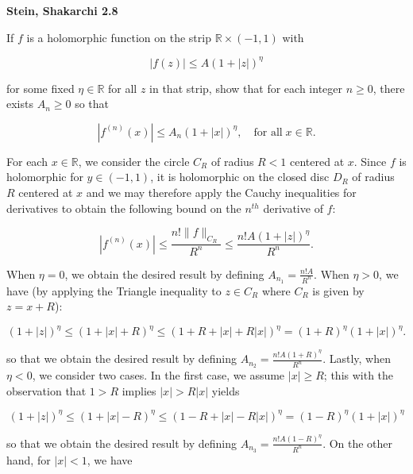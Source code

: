 \textbf{Stein, Shakarchi 2.8}

If $f$ is a holomorphic function on the strip $\mathbb{R} \times (-1, 1)$ with

$$
\left| f(z)  \right| \le A (1 + |z|)^{\eta}
$$

for some fixed $\eta \in \mathbb{R}$ for all $z$ in that strip, show that for each integer $n \ge 0$, there exists 
$A_n \ge 0$ so that 

$$
\left| f^{(n)}(x) \right| \le A_n (1 + |x|)^{\eta}, \quad \text{for all} \; x \in \mathbb{R}.
$$

\begin{solution}
    For each $x \in \mathbb{R}$, we consider the circle $C_R$ of radius $R < 1$ centered at $x$. Since $f$ is 
    holomorphic for $y \in (-1, 1)$, it is holomorphic on the closed disc $D_R$ of radius $R$ centered at $x$ and we
    may therefore apply the Cauchy inequalities for derivatives to obtain the following bound on the $n^{th}$ derivative 
    of $f$:

    $$
    \left| f^{(n)}(x) \right| \le \frac{n! \lVert f \rVert_{C_R}}{R^n} 
                              \le \frac{n! A(1 + |z|)^{\eta}}{R^n}.
    $$

    When $\eta = 0$, we obtain the desired result by defining $A_{n_1} = \frac{n! A}{R^n}$. When $\eta > 0$, we have (by 
    applying the Triangle inequality to $z \in C_R$ where $C_R$ is given by $z = x + R$):

    $$
    \left(1 + |z| \right)^{\eta} \le \left(1 + |x| + R \right)^{\eta} 
                                 \le (1 + R + |x| + R|x|)^{\eta} 
                                 = (1 + R)^{\eta} (1 + |x|)^{\eta}.
    $$

    so that we obtain the desired result by defining $A_{n_2} = \frac{n! A (1 + R)^{\eta}}{R^n}$. Lastly, when $\eta < 0$, 
    we consider two cases. In the first case, we assume $|x| \ge R$; this with the observation that $1 > R$ implies
    $|x| > R |x|$ yields

    $$
    \left(1 + |z| \right)^{\eta} \le \left(1 + |x| - R \right)^{\eta} 
                                 \le (1 - R + |x| - R|x|)^{\eta} 
                                 = (1 - R)^{\eta} (1 + |x|)^{\eta}
    $$

    so that we obtain the desired result by defining $A_{n_3} = \frac{n! A (1 - R)^{\eta}}{R^n}$. On the other hand, for 
    $|x| < 1$, we have


\end{solution}
